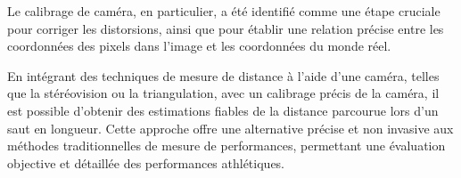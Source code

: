 Le calibrage de caméra, en particulier, a été identifié comme une étape cruciale pour corriger les distorsions, ainsi que pour établir une relation précise entre les coordonnées des pixels dans l'image et les coordonnées du monde réel.  

En intégrant des techniques de mesure de distance à l'aide d'une caméra, telles que la stéréovision ou la triangulation, avec un calibrage précis de la caméra, il est possible d'obtenir des estimations fiables de la distance parcourue lors d'un saut en longueur. Cette approche offre une alternative précise et non invasive aux méthodes traditionnelles de mesure de performances, permettant une évaluation objective et détaillée des performances athlétiques.
 